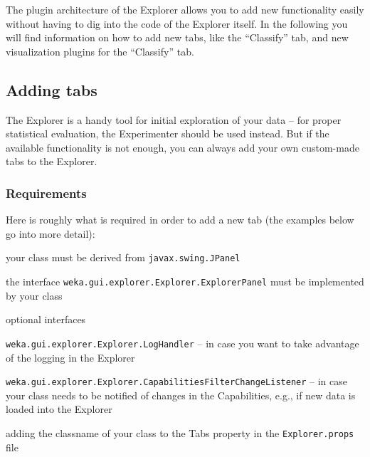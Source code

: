 %
%
%
%


The plugin architecture of the Explorer allows you to add new functionality
easily without having to dig into the code of the Explorer itself. In the
following you will find information on how to add new tabs, like the
``Classify'' tab, and new visualization plugins for the ``Classify'' tab.

\subsection{Adding tabs}
The Explorer is a handy tool for initial exploration of your data -- for
proper statistical evaluation, the Experimenter should be used instead. But if
the available functionality is not enough, you can always add your own
custom-made tabs to the Explorer.

\subsubsection{Requirements}
Here is roughly what is required in order to add a new tab (the examples below
go into more detail):
\begin{tight_itemize}
  \item your class must be derived from \texttt{javax.swing.JPanel}
  \item the interface \texttt{weka.gui.explorer.Explorer.ExplorerPanel} must be
implemented by your class
  \item optional interfaces
  \begin{tight_itemize}
	\item \texttt{weka.gui.explorer.Explorer.LogHandler} -- in case
you want to take advantage of the logging in the Explorer
	\item \texttt{weka.gui.explorer.Explorer.CapabilitiesFilterChangeListener}
-- in case your class needs to be notified of changes in the
Capabilities, e.g., if new data is loaded into the Explorer
  \end{tight_itemize}
  \item adding the classname of your class to the Tabs property in the
\texttt{Explorer.props} file
\end{tight_itemize}

